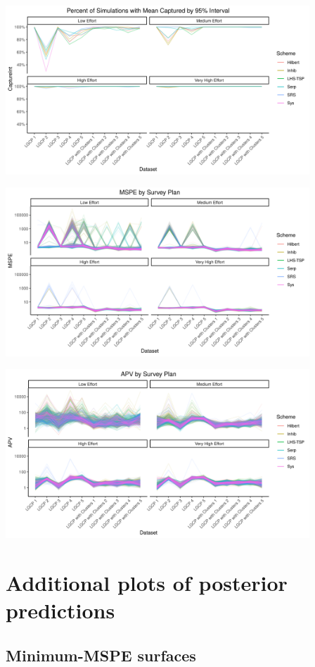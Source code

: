 \documentclass[review]{elsarticle}
\begin{document}
\includegraphics[width=4.5in]{../graphics/IntCapture-profile.png}

\includegraphics[width=4.5in]{../graphics/MSPE-profile.png}

\includegraphics[width=4.5in]{../graphics/APV-profile.png}


\section{Additional plots of posterior predictions}

\subsection{Minimum-MSPE surfaces}
\end{document}
